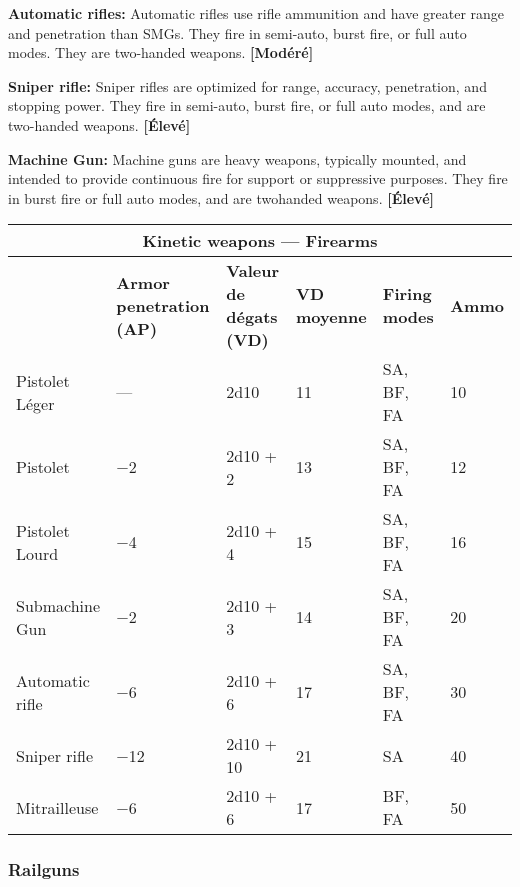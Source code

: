 {{\textbf{Automatic rifles:} Automatic rifles use rifle ammunition and have greater range and penetration than SMGs. They fire in semi-auto, burst fire, or full auto modes. They are two-handed weapons. \textbf{[Modéré]} 

\textbf{Sniper rifle:} Sniper rifles are optimized for range, accuracy, penetration, and stopping power. They fire in semi-auto, burst fire, or full auto modes, and are two-handed weapons. \textbf{[Élevé]} 

\textbf{Machine Gun:} Machine guns are heavy weapons, typically mounted, and intended to provide continuous fire for support or suppressive purposes. They fire in burst fire or full auto modes, and are twohanded weapons. \textbf{[Élevé]} 

\begin{table} \begin{tabularx}{\textwidth}{|l|X|X|X|l|l|} \hline

\multicolumn{6}{|c|}{\textbf{Kinetic weapons --- Firearms}} \\ \hline

&\textbf{Armor penetration (AP)}	&\textbf{Valeur de dégats (VD)}	&\textbf{VD moyenne}	&\textbf{Firing modes}	&\textbf{Ammo} \\ \hline

Pistolet Léger	&--- &2d10	&11	&SA, BF, FA	&10 \\ \hline

Pistolet	&$-$2	&2d10 + 2	&13	&SA, BF, FA	&12 \\ \hline

Pistolet Lourd	&$-$4	&2d10 + 4	&15	&SA, BF, FA	&16 \\ \hline

Submachine Gun	&$-$2	&2d10 + 3	&14	&SA, BF, FA	&20 \\ \hline

Automatic rifle	&$-$6	&2d10 + 6	&17	&SA, BF, FA	&30 \\ \hline

Sniper rifle	&$-$12	&2d10 + 10	&21	&SA	&40 \\ \hline

Mitrailleuse	&$-$6	&2d10 + 6	&17	&BF, FA	&50 \\ \hline

\end{tabularx} \label{tab:kinetic-firearms} \end{table} 

\subsubsection{Railguns} 

}}
